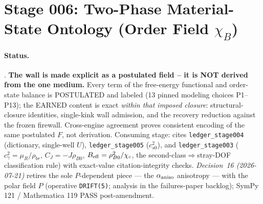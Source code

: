 \section{Stage 006: Two-Phase Material-State Ontology (Order Field \texorpdfstring{$\chi_B$}{chi\_B})}

\claimstatus{\StatusExactClosure}

\paragraph{Status.}
\StatusExactClosure. \textbf{The wall is made explicit as a postulated field --
it is NOT derived from the one medium.} Every term of the free-energy functional
and order-state balance is POSTULATED and labeled (13 pinned modeling choices
P1--P13); the EARNED content is exact \emph{within that imposed closure}:
structural-closure identities, single-kink wall admission, and the recovery
reduction against the frozen firewall. Cross-engine agreement proves consistent
encoding of the same postulated \(F\), not derivation. Consuming stage: cites
\texttt{ledger\_stage004} (dictionary, single-well \(U\)),
\texttt{ledger\_stage005} (\(c_{s0}^2\)), and \texttt{ledger\_stage003}
(\(c_\gamma^2=\mu_R/\rho_{br}\), \(C_J=-J\rho_{B0}\),
\(B_{\rm eff}=\rho_{B0}^2/\chi_c\), the second-class\(\Rightarrow\)stray-DOF
classification rule) with exact-value citation-integrity checks.
\emph{Decision~16 (2026-07-21)} retires the sole \(P\)-dependent piece --- the
\(\alpha_{\rm aniso}\) anisotropy --- with the polar field \(P\) (operative
\texttt{DRIFT(5)}; analysis in the failures-paper backlog);
SymPy 121 / Mathematica 119 PASS post-amendment.

